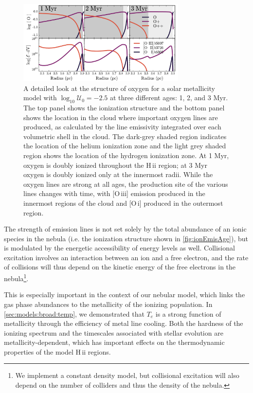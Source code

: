 \documentclass[trackchanges, twocolumn, tighten]{aastex61}
\newcommand{\Fig}[1]{\autoref{fig:#1}}
\newcommand{\Sec}[1]{\autoref{sec:#1}}
\newcommand{\logten}{\ensuremath{\log_{10}}}
\newcommand{\Te}{\ensuremath{T_{e}}}
\newcommand{\oiii}{[O\,{\sc iii}]\xspace}
\newcommand{\oi}{[O\,{\sc i}]\xspace}
\newcommand{\hii}{H\,{\sc ii}\xspace}
\newcommand{\logU}{\ensuremath{\logten \mathcal{U}_0}}
\begin{document}
\begin{figure}
  \begin{centering}
    \includegraphics[width=0.75\textwidth]{f7.pdf}
    \caption{A detailed look at the structure of oxygen for a solar metallicity model with $\logU = -2.5$ at three different ages: 1, 2, and 3 Myr. The top panel shows the ionization structure and the bottom panel shows the location in the cloud where important oxygen lines are produced, as calculated by the line emissivity integrated over each volumetric shell in the cloud. The dark-grey shaded region indicates the location of the helium ionization zone and the light grey shaded region shows the location of the hydrogen ionization zone. At 1 Myr, oxygen is doubly ionized throughout the \hii region; at 3 Myr oxygen is doubly ionized only at the innermost radii. While the oxygen lines are strong at all ages, the production site of the various lines changes with time, with \oiii{} emission produced in the innermost regions of the cloud and \oi{} produced in the outermost region.}
    \label{fig:ionEmisAge}
  \end{centering}
\end{figure}

The strength of emission lines is not set solely by the total abundance of an ionic species in the nebula (i.e. the ionization structure shown in \Fig{ionEmisAge}), but is modulated by the energetic accessibility of energy levels as well. Collisional excitation involves an interaction between an ion and a free electron, and the rate of collisions will thus depend on the kinetic energy of the free electrons in the nebula\footnote{We implement a constant density model, but collisional excitation will also depend on the number of colliders and thus the density of the nebula.}.

This is especially important in the context of our nebular model, which links the gas phase abundances to the metallicity of the ionizing population. In \Sec{models:broad:temp}, we demonstrated that \Te{} is a strong function of metallicity through the efficiency of metal line cooling. Both the hardness of the ionizing spectrum and the timescales associated with stellar evolution are metallicity-dependent, which has important effects on the thermodynamic properties of the model \hii regions.
\end{document}
